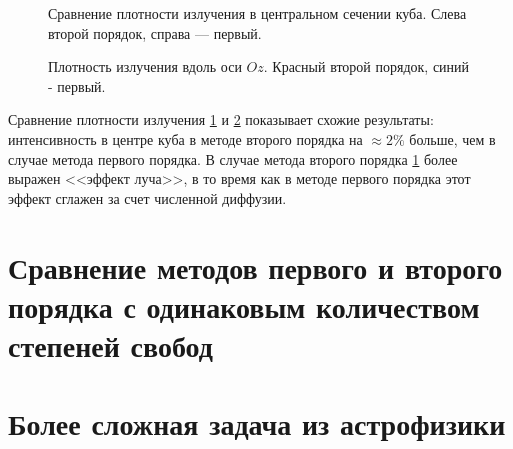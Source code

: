 \begin{figure}[ht!]
\caption{Сравнение плотности излучения в центральном сечении куба. Слева второй порядок, справа --- первый.}
\label{fig:9}
\end{figure}

\begin{figure}[ht!]
\caption{Плотность излучения вдоль оси $Oz$. Красный второй порядок, синий - первый.}
\label{fig:10}
\end{figure}
Сравнение плотности излучения \ref{fig:9} и \ref{fig:10} показывает схожие результаты: интенсивность в центре куба в методе второго порядка на $\approx 2 \%$ больше, чем в случае метода первого порядка. В случае метода второго порядка \ref{fig:9} более выражен <<эффект луча>>, в то время как в методе первого порядка этот эффект сглажен за счет численной диффузии. 

\section{Сравнение методов первого и второго порядка с одинаковым количеством степеней свобод}
\section{Более сложная задача из астрофизики}